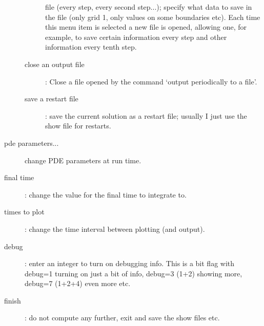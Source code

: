 \begin{description}
\begin{description}
          file (every step, every second step...); specify what data to save in the file (only grid 1, only
           values on some boundaries etc).  Each time this menu item is selected a new file is opened, allowing
           one, for example, to save certain information every step and other information every tenth step.
        \item[close an output file] : Close a file opened by the command `output periodically to a file'.
       \item[save a restart file] : save the current solution as a restart file; usually I just use the
         show file for restarts.
    \end{description}
    \item[pde parameters...] change PDE parameters at run time.
    \item[final time] : change the value for the final time to integrate to.
    \item[times to plot] : change the time interval between plotting (and output).
    \item[debug] : enter an integer to turn on debugging info. This is a bit flag with debug=1 turning on just
       a bit of info, debug=3 (1+2) showing more, debug=7 (1+2+4) even more etc.
    \item[finish] : do not compute any further, exit and save the show files etc.
  \end{description}
